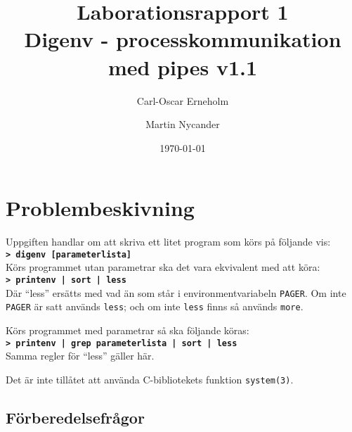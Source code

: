 \documentclass[a4paper,10pt,titlepage]{article}
\title{Laborationsrapport 1 \\ Digenv - processkommunikation med pipes v1.1}
\author{Carl-Oscar Erneholm \and Martin Nycander}
\date{\today}
\newcommand{\cmdline}[1]{\mbox{\textbf{\texttt{> #1}}}}
\begin{document}


\maketitle

\tableofcontents
\thispagestyle{empty}
\newpage
\setcounter{page}{1}
\section{Problembeskivning}

Uppgiften handlar om att skriva ett litet program som körs på följande vis: \\
\cmdline{digenv [parameterlista]} \\
Körs programmet utan parametrar ska det vara ekvivalent med att köra: \\
\cmdline{printenv | sort | less} \\
Där ``less'' ersätts med vad än som står i environmentvariabeln \verb!PAGER!. Om inte \verb!PAGER! är satt används \verb!less!; och om inte \verb!less! finns så används \verb!more!.

Körs programmet med parametrar så ska följande köras: \\
\cmdline{printenv | grep parameterlista | sort | less} \\
Samma regler för ``less'' gäller här.

Det är inte tillåtet att använda C-bibliotekets funktion \verb!system(3)!.

\subsection{Förberedelsefrågor}
\end{document}
